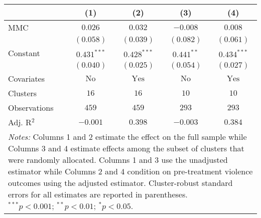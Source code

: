 
\begin{tabular}{l c c c c}
\toprule
 & (1) & (2) & (3) & (4) \\
\midrule
MMC          & $0.026$       & $0.032$        & $-0.008$      & $0.008$        \\
             & $(0.058)$     & $(0.039)$      & $(0.082)$     & $(0.061)$      \\
Constant     & $0.431^{***}$ & $0.428^{***}$  & $0.441^{**}$  & $0.434^{***}$  \\
             & $(0.040)$     & $(0.025)$      & $(0.054)$     & $(0.027)$      \\
\midrule
Covariates   & $\textrm{No}$ & $\textrm{Yes}$ & $\textrm{No}$ & $\textrm{Yes}$ \\
Clusters     & $16$          & $16$           & $10$          & $10$           \\
Observations & $459$         & $459$          & $293$         & $293$          \\
Adj. R$^2$   & $-0.001$      & $0.398$        & $-0.003$      & $0.384$        \\
\bottomrule
\multicolumn{5}{l}{\scriptsize{\parbox{.5\linewidth}{\vspace{2pt} 
       \textit{Notes:} Columns 1 and 2 estimate the effect on the full sample while Columns 3 
       and 4 estimate effects among the subset of clusters that were randomly allocated.
       Columns 1 and 3 use the unadjusted estimator while Columns 2 and 4 condition on 
       pre-treatment violence outcomes using the adjusted estimator. Cluster-robust 
       standard errors for all estimates are reported in parentheses. \\ $^{***}p<0.001$; $^{**}p<0.01$; $^{*}p<0.05$.}}}
\end{tabular}

